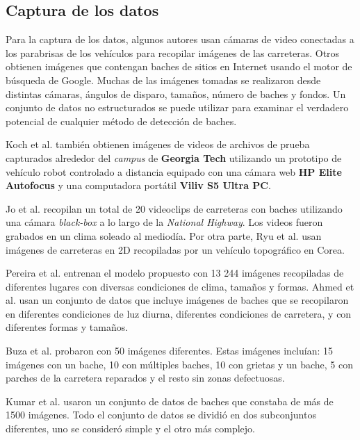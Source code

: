 	\subsection{Captura de los datos}
	Para la captura de los datos, algunos autores usan cámaras de video conectadas a los  parabrisas de los vehículos para 
	recopilar imágenes de las carreteras. Otros obtienen imágenes que contengan baches de  sitios en 
	Internet usando el motor de búsqueda de Google. Muchas de las imágenes tomadas 
	se realizaron desde distintas cámaras, ángulos de disparo, tamaños, número de baches y fondos. Un conjunto de datos no estructurados se puede utilizar para examinar el verdadero potencial de cualquier método de 
	detección de baches.

	Koch et al. también obtienen  imágenes de videos de archivos de prueba capturados alrededor 
	del \emph{campus} de \textbf{Georgia Tech} utilizando un prototipo de vehículo robot controlado a distancia equipado con una cámara web 
	\textbf{HP Elite Autofocus} y una computadora portátil \textbf{Viliv S5 Ultra PC}. 

	Jo et al.  recopilan un total de 20 videoclips de carreteras con baches utilizando una cámara 
	\emph{black-box}  a lo largo de la \emph{National Highway}. Los videos fueron grabados en un clima soleado al mediodía.
	Por otra parte, Ryu et al. usan imágenes de carreteras en 2D recopiladas por un vehículo topográfico
	en Corea. 

	Pereira et al. entrenan el modelo propuesto  con 13 244 imágenes recopiladas de diferentes
	lugares con diversas condiciones de clima, tamaños y formas. Ahmed et al. usan un conjunto de 
	datos que incluye imágenes de baches que se recopilaron en diferentes condiciones de luz diurna, diferentes condiciones de carretera, 
	y con diferentes formas y tamaños.

	Buza et al. probaron con 50 imágenes diferentes. Estas imágenes incluían: 15 imágenes con un bache, 10 con
	múltiples baches, 10 con grietas y un bache, 5 con parches de la carretera reparados y el resto sin zonas defectuosas.

	Kumar et al. usaron un conjunto de datos de baches que constaba de más de 1500 imágenes.
	Todo el conjunto de datos se dividió en dos subconjuntos diferentes, uno se consideró simple y el otro más complejo.

